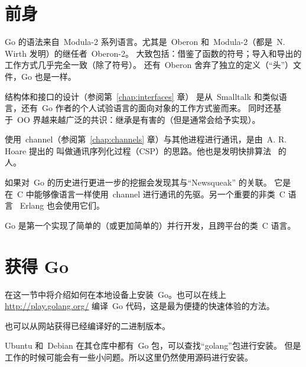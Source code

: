 \section{前身}
Go 的语法来自~Modula-2 系列语言。尤其是~Oberon 和~Modula-2（都是~N. Wirth 发明）的继任者~Oberon-2。
大致包括：借鉴了函数的符号；导入和导出的工作方式几乎完全一致（除了符号）。 
还有~Oberon 舍弃了独立的定义（“头”）文件，Go 也是一样。

结构体和接口的设计（参阅第~\ref{chap:interfaces} 章）
是从~Smalltalk 和类似语言，还有~Go 作者的个人试验语言的面向对象的工作方式鉴而来。
同时还基于~OO 界越来越广泛的共识：继承是有害的（但是通常会给予实现）。

使用~channel（参阅第~\ref{chap:channels} 章）与其他进程进行通讯，是由~A. R. Hoare \cite{hoare}提出的
叫做通讯序列化过程（CSP）的思路。他也是发明快排算法~\cite{quicksort} 的人。

如果对~Go 的历史进行更进一步的挖掘会发现其与``Newsqueak'' \cite{newsqueak} 的关联。
它是在~C 中能够像语言一样使用~channel 进行通讯的先驱。另一个重要的非类~C 语言
~Erlang \cite{erlang} 也会使用它们。

\begin{lbar}[]
Go 是第一个实现了简单的（或更加简单的）并行开发，且跨平台的类~C 语言。
\end{lbar}

\section{获得 Go}
在这一节中将介绍如何在本地设备上安装~Go。也可以在线上 \url{http://play.golang.org/} 编译~Go 代码，这是最为便捷的快速体验的方法。

也可以从网站\cite{go_install}获得已经编译好的二进制版本。

Ubuntu 和~Debian 在其仓库中都有~Go 包，可以查找``golang''包进行安装。
但是工作的时候可能会有一些小问题。所以这里仍然使用源码进行安装。

